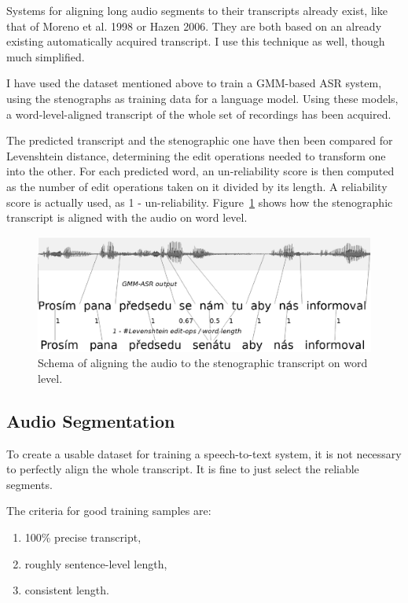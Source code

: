 \documentclass[runningheads,a4paper]{llncs}
\begin{document}
Systems for aligning long audio segments to their transcripts already exist,
like that of Moreno et al. 1998\cite{moreno1998recursive} or Hazen
2006\cite{hazen2006automatic}. They are both based on an already existing
automatically acquired transcript. I use this technique as well, though much
simplified.

I have used the dataset mentioned above\cite{pspdata} to train a GMM-based ASR
system, using the stenographs as training data for a language model. Using these
models, a word-level-aligned transcript of the whole set of recordings has been
acquired.

The predicted transcript and the stenographic one have then been compared for
Levenshtein distance, determining the edit operations needed to transform one
into the other. For each predicted word, an un-reliability score is then
computed as the number of edit operations taken on it divided by its length.
A reliability score is actually used, as 1 - un-reliability.
Figure~\ref{fig:align} shows how the stenographic transcript is aligned with the
audio on word level.

\begin{figure}[htpb]
\includegraphics[scale=0.4]{rc/align.eps}
\caption{Schema of aligning the audio to the stenographic transcript on word
level.}
\label{fig:align}
\end{figure}

\subsection{Audio Segmentation}

To create a usable dataset for training a speech-to-text system, it is not
necessary to perfectly align the whole transcript. It is fine to just select the
reliable segments.

The criteria for good training samples are:
\begin{enumerate}
\item{100\% precise transcript,}
\item{roughly sentence-level length,}
\item{consistent length.}
\end{enumerate}
\end{document}
